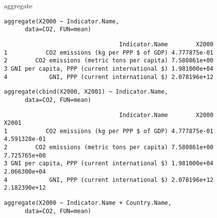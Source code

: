 \documentclass[xcolor={usenames,svgnames,dvipsnames}]{beamer}
\begin{document}
\begin{frame}[fragile,label=sec-3-6]{aggregate}
 \lstset{language=R,numbers=none}
\begin{lstlisting}
aggregate(X2000 ~ Indicator.Name,
	  data=CO2, FUN=mean)
\end{lstlisting}

\begin{verbatim}
                                 Indicator.Name        X2000
1           CO2 emissions (kg per PPP $ of GDP) 4.777875e-01
2        CO2 emissions (metric tons per capita) 7.580861e+00
3 GNI per capita, PPP (current international $) 1.981000e+04
4            GNI, PPP (current international $) 2.078196e+12
\end{verbatim}

\lstset{language=R,numbers=none}
\begin{lstlisting}
aggregate(cbind(X2000, X2001) ~ Indicator.Name,
	  data=CO2, FUN=mean)
\end{lstlisting}

\begin{verbatim}
                                 Indicator.Name        X2000        X2001
1           CO2 emissions (kg per PPP $ of GDP) 4.777875e-01 4.591328e-01
2        CO2 emissions (metric tons per capita) 7.580861e+00 7.725765e+00
3 GNI per capita, PPP (current international $) 1.981000e+04 2.066300e+04
4            GNI, PPP (current international $) 2.078196e+12 2.182390e+12
\end{verbatim}

\lstset{language=R,numbers=none}
\begin{lstlisting}
aggregate(X2000 ~ Indicator.Name + Country.Name,
	  data=CO2, FUN=mean)
\end{lstlisting}


\end{frame}
\end{document}
